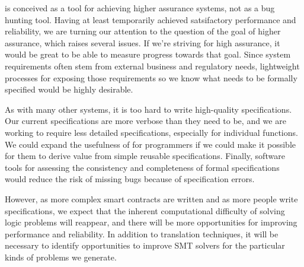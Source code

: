 

\MVP is conceived as a tool for achieving higher assurance systems,
not as a bug hunting tool. Having at least temporarily achieved
satsifactory performance and reliability, we are turning our attention
to the question of the goal of higher assurance, which raises several
issues.  If we're striving for high assurance, it would be great to be
able to measure progress towards that goal.
Since system requirements
often stem from external business and regulatory needs, lightweight
processes for exposing those requirements so we know what needs to be
formally specified would be highly desirable.

As with many other systems, it is too hard to write high-quality
specifications.  Our current specifications are more verbose than they
need to be, and we are working to require less detailed
specifications, especially for individual functions.  We could expand
the usefulness of \MVP for programmers if we could make it possible
for them to derive value from simple reusable specifications.
Finally, software tools for assessing the consistency and completeness
of formal specifications would reduce the risk of missing bugs because
of specification errors.

However, as more complex smart contracts are written and as more
people write specifications, we expect that the inherent computational
difficulty of solving logic problems will reappear, and there will be
more opportunities for improving performance and reliability.  In addition
to translation techniques, it will be necessary to identify opportunities
to improve SMT solvers for the particular kinds of problems we generate.


